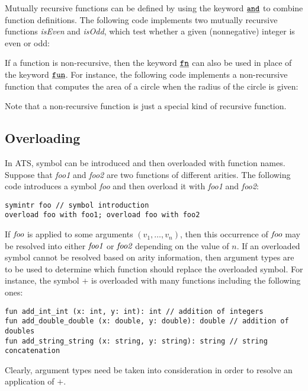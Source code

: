Mutually recursive functions can be defined by using the keyword $\underline{\texttt{and}}$
to combine function definitions. The following code implements two mutually
recursive functions {\it isEven} and {\it isOdd}, which test whether a given
(nonnegative) integer is even or odd:


If a function is non-recursive, then the keyword $\underline{\texttt{fn}}$ can also be used
in place of the keyword $\underline{\texttt{fun}}$. For instance, the following code
implements a non-recursive function that computes the area of a circle when
the radius of the circle is given:

Note that a non-recursive function is just a special kind of recursive
function.

\subsection{Overloading}
In ATS, symbol can be introduced and then overloaded with function names.
Suppose that {\it foo1} and {\it foo2} are two functions of different
arities. The following code introduces a symbol {\it foo} and then overload
it with {\it foo1} and {\it foo2}:
\begin{verbatim}
symintr foo // symbol introduction
overload foo with foo1; overload foo with foo2
\end{verbatim}
If $\mbox{\it foo}$ is applied to some arguments $(v_1,\ldots,v_n)$, then
this occurrence of $\mbox{\it foo}$ may be resolved into either $\mbox{\it
foo1}$ or $\mbox{\it foo2}$ depending on the value of $n$.  If an
overloaded symbol cannot be resolved based on arity information, then
argument types are to be used to determine which function should replace
the overloaded symbol.  For instance, the symbol $+$ is overloaded with
many functions including the following ones:
\begin{verbatim}
fun add_int_int (x: int, y: int): int // addition of integers
fun add_double_double (x: double, y: double): double // addition of doubles
fun add_string_string (x: string, y: string): string // string concatenation
\end{verbatim}
Clearly, argument types need be taken into consideration in order to
resolve an application of $+$.


